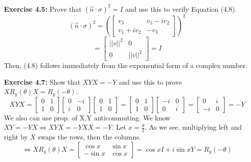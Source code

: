 \documentclass{article}
\begin{document}
\begin{tcolorbox}\textbf{Exercise 4.5:} 
 Prove that $(\hat{n} \cdot \sigma)^2 = I$ and use this to verify Equation (4.8).\\
	$$(\hat{n} \cdot \sigma)^2 = (\begin{bmatrix}v_3 & v_1 - iv_2 \\ v_1 + iv_2 & -v_3 \end{bmatrix})^{2}$$
	$$= \begin{bmatrix} ||v||^2 & 0 \\ 0 & ||v||^2 \end{bmatrix}= I$$
	Then, (4.8) follows immediately from the exponential form of a complex number.
\end{tcolorbox}
\begin{tcolorbox}\textbf{Exercise 4.7:}
	Show that $XYX = -Y$ and use this to prove $XR_y(\theta)X = R_y(-\theta)$.
	$$XYX = \begin{bmatrix} 0 & 1 \\ 1 & 0\end{bmatrix} \begin{bmatrix} 0 & -i \\ i & 0 \end{bmatrix} \begin{bmatrix} 0 & 1 \\ 1 & 0\end{bmatrix} = \begin{bmatrix} 0 & 1 \\ 1 & 0\end{bmatrix}\begin{bmatrix} -i& 0 \\ 0 & i \end{bmatrix}=\begin{bmatrix}0 & i \\ -i & 0\end{bmatrix} = -Y$$
	We also can use prop. of X,Y anticommuting.
	We know$XY=-YX \iff XYX = -YXX = -Y$.
	Let $x =\frac{\theta}{2}$. As we see, multiplying left and right by $X$ swaps the rows, then the columns.
	$$\iff XR_y(\theta)X = \begin{bmatrix} \cos x & \sin x \\ -\sin x & \cos x\end{bmatrix} = \cos x I + i \sin x Y = R_y(-\theta)$$
\end{tcolorbox}
\end{document}
